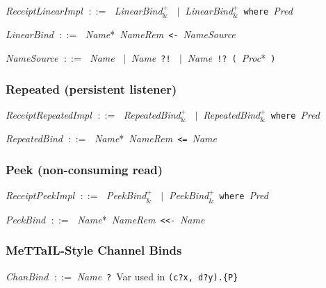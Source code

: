 \documentclass[11pt,a4paper]{article}
\newcommand{\kw}[1]{\texttt{\textcolor{kw}{#1}}}       %
\newcommand{\sym}[1]{\texttt{#1}}                       %
\newcommand{\nt}[1]{\textit{\textcolor{nt}{#1}}}        %
\newcommand{\tok}[1]{\textsf{#1}}                       %
\newcommand{\OR}{\ensuremath{\;\mid\;}}                  %
\newcommand{\bnfdef}{\ensuremath{\;::=\;}}               %
\newenvironment{grammar}{%
  \par\smallskip\begin{list}{}{%
    \setlength{\leftmargin}{1.5em}%
    \setlength{\itemsep}{2pt}%
    \setlength{\parsep}{0pt}}%
}{\end{list}\smallskip}
\begin{document}
\begin{grammar}
\item \nt{ReceiptLinearImpl} \bnfdef
    \nt{LinearBind}$^+_{\texttt{\&}}$
    \OR \nt{LinearBind}$^+_{\texttt{\&}}$~\kw{where}~\nt{Pred}
\item \nt{LinearBind} \bnfdef
    \nt{Name}*~\nt{NameRem}~\sym{<-}~\nt{NameSource}
\item \nt{NameSource} \bnfdef
    \nt{Name}
    \OR \nt{Name}~\sym{?!}
    \OR \nt{Name}~\sym{!?}~\sym{(}~\nt{Proc}*~\sym{)}
\end{grammar}

\subsubsection{Repeated (persistent listener)}

\begin{grammar}
\item \nt{ReceiptRepeatedImpl} \bnfdef
    \nt{RepeatedBind}$^+_{\texttt{\&}}$
    \OR \nt{RepeatedBind}$^+_{\texttt{\&}}$~\kw{where}~\nt{Pred}
\item \nt{RepeatedBind} \bnfdef
    \nt{Name}*~\nt{NameRem}~\sym{<=}~\nt{Name}
\end{grammar}

\subsubsection{Peek (non-consuming read)}

\begin{grammar}
\item \nt{ReceiptPeekImpl} \bnfdef
    \nt{PeekBind}$^+_{\texttt{\&}}$
    \OR \nt{PeekBind}$^+_{\texttt{\&}}$~\kw{where}~\nt{Pred}
\item \nt{PeekBind} \bnfdef
    \nt{Name}*~\nt{NameRem}~\sym{<<-}~\nt{Name}
\end{grammar}

\subsubsection{MeTTaIL-Style Channel Binds}

\begin{grammar}
\item \nt{ChanBind} \bnfdef \nt{Name}~\sym{?}~\tok{Var}
    \hfill\textcolor{cmt}{used in \texttt{(c?x, d?y).\{P\}}}
\end{grammar}


\end{document}
